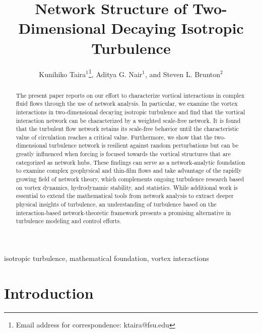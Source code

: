 \documentclass{jfm}
\title[Network Structure of Two-Dimensional Decaying Isotropic Turbulence]
{Network Structure of Two-Dimensional Decaying Isotropic Turbulence}
\author[K. Taira, A. G. Nair, and S. L. Brunton]%
{
Kunihiko Taira$^1$\thanks{Email address for correspondence: ktaira@fsu.edu},
Aditya G. Nair$^1$, and Steven L. Brunton$^2$
}
\affiliation{$^1$Department of Mechanical Engineering, 
Florida State University, Tallahassee, FL 32310, USA\\ [\affilskip]
$^2$Department of Mechanical Engineering, 
University of Washington, Seattle, WA 98195, USA}
\begin{document}
\maketitle

 
\begin{abstract}
The present paper reports on our effort to characterize vortical interactions in complex fluid flows through the use of network analysis.  In particular, we examine the vortex interactions in two-dimensional decaying isotropic turbulence and find that the vortical interaction network can be characterized by a weighted scale-free network.  It is found that the turbulent flow network retains its scale-free behavior until the characteristic value of circulation reaches a critical value.  
Furthermore, we show that the two-dimensional turbulence network is resilient against random perturbations but can be greatly influenced when forcing is focused towards the vortical structures that are categorized as network hubs.  These findings can serve as a network-analytic foundation to examine complex geophysical and thin-film flows and take advantage of the rapidly growing field of network theory, which complements ongoing turbulence research based on vortex dynamics, hydrodynamic stability, and statistics.  While additional work is essential to extend the mathematical tools from network analysis to extract deeper physical insights of turbulence, an understanding of turbulence based on the interaction-based network-theoretic framework presents a promising alternative in turbulence modeling and control efforts.
\end{abstract}


\begin{keywords}
isotropic turbulence, mathematical foundation, vortex interactions
\end{keywords}


\section{Introduction}
\label{sec:intro}
\end{document}
